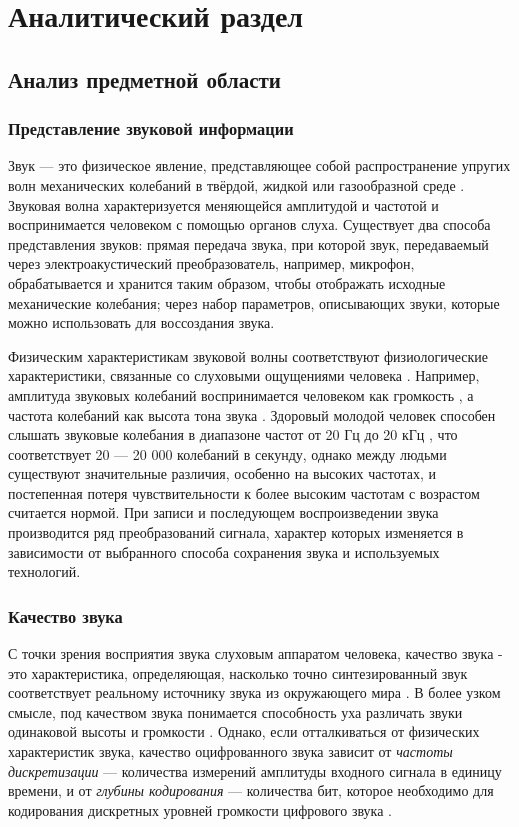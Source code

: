 \chapter{Аналитический раздел}
\label{cha:analysis}

\section{Анализ предметной области}

\subsection{Представление звуковой информации}

Звук --- это физическое явление, представляющее собой распространение упругих волн механических колебаний в твёрдой, жидкой или газообразной среде \cite{WIS}. Звуковая волна характеризуется меняющейся амплитудой и частотой \cite{SoundVolume} и воспринимается человеком с помощью органов слуха. 
Существует два способа представления звуков: прямая передача звука, при которой звук, передаваемый через электроакустический преобразователь, например, микрофон, обрабатывается и хранится таким образом, чтобы отображать исходные механические колебания; через набор параметров, описывающих звуки, которые можно использовать для воссоздания звука.

Физическим характеристикам звуковой волны соответствуют физиологические характеристики, связанные со слуховыми ощущениями человека \cite{TS}. Например, амплитуда звуковых колебаний воспринимается человеком как громкость \cite{SoundVolume}, а частота колебаний как высота тона звука \cite{FRHH}. Здоровый молодой человек способен слышать звуковые колебания в диапазоне частот от 20 Гц до 20 кГц \cite{FRHH}, что соответствует 20 --- 20 000 колебаний в секунду, однако между людьми существуют значительные различия, особенно на высоких частотах, и постепенная потеря чувствительности к более высоким частотам с возрастом считается нормой. При записи и последующем воспроизведении звука производится ряд преобразований сигнала, характер которых изменяется в зависимости от выбранного способа сохранения звука и используемых технологий.

\subsection{Качество звука} 

С точки зрения восприятия звука слуховым аппаратом человека, качество звука - это характеристика, определяющая, насколько точно синтезированный звук соответствует реальному источнику звука из окружающего мира \cite{TS}. В более узком смысле, под качеством звука понимается способность уха различать звуки одинаковой высоты и громкости \cite{TIMBRE}. Однако, если отталкиваться от физических характеристик звука, качество оцифрованного звука зависит от \textit{частоты дискретизации} --- количества измерений амплитуды входного сигнала в единицу времени, и от \textit{глубины кодирования} --- количества бит, которое необходимо для кодирования дискретных уровней громкости цифрового звука \cite{KZI}.



